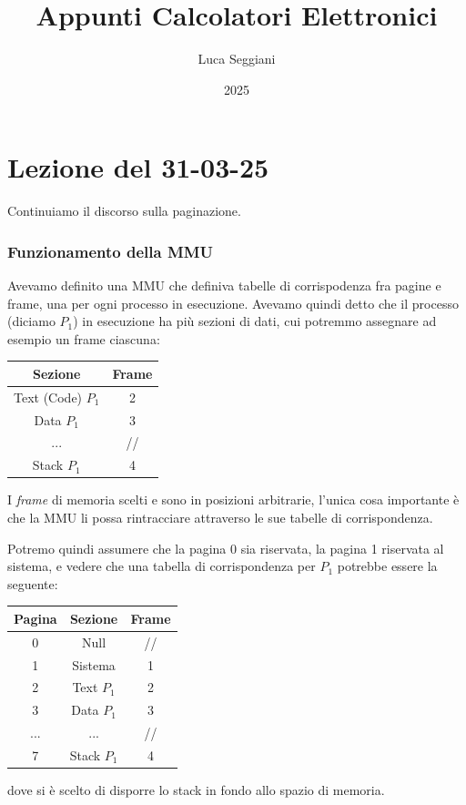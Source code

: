 \documentclass[a4paper,11pt]{article}
\title{Appunti Calcolatori Elettronici}
\author{Luca Seggiani}
\date{2025}
\begin{document}
\section{Lezione del 31-03-25}

\thispagestyle{empty}
\pagestyle{fancy}

Continuiamo il discorso sulla paginazione.

\subsubsection{Funzionamento della MMU}
Avevamo definito una MMU che definiva tabelle di corrispodenza fra pagine e frame, una per ogni processo in esecuzione.
Avevamo quindi detto che il processo (diciamo $P_1$) in esecuzione ha più sezioni di dati, cui potremmo assegnare ad esempio un frame ciascuna:
\begin{table}[H]
	\center
	\begin{tabular} { | c | c | }
		\bfseries Sezione & \bfseries Frame \\
		\hline
		\textsf{Text (Code)} $P_1$ & 2 \\
		\textsf{Data} $P_1$ & 3 \\
		... & // \\
		\textsf{Stack} $P_1$ & 4 \\
	\end{tabular}
\end{table}

I \textit{frame} di memoria scelti e sono in posizioni arbitrarie, l'unica cosa importante è che la MMU li possa rintracciare attraverso le sue tabelle di corrispondenza.

Potremo quindi assumere che la pagina 0 sia riservata, la pagina 1 riservata al sistema, e vedere che una tabella di corrispondenza per $P_1$ potrebbe essere la seguente:
\begin{table}[H]
	\center
	\begin{tabular} { | c | c | c | }
		\bfseries Pagina & \bfseries Sezione & \bfseries Frame \\
		\hline
		0 & \textsf{Null} & // \\
		1 & \textsf{Sistema} & 1 \\
		2 & \textsf{Text} $P_1$ & 2 \\
		3 & \textsf{Data} $P_1$ & 3 \\
		... & ... & // \\
		7 & \textsf{Stack} $P_1$ & 4 \\
	\end{tabular}
\end{table}
dove si è scelto di disporre lo stack in fondo allo spazio di memoria.
\end{document}
